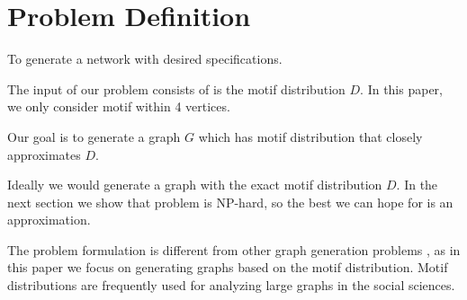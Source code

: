 \section{Problem Definition}
\label{sec:problem}
 To generate a network with desired specifications.

 The input of our problem consists of is the motif 
distribution $D$. In this paper, we only consider motif within 4 vertices.

 Our goal is to generate a graph $G$ which has motif distribution that closely
approximates $D$.

Ideally we would generate a graph with the exact motif distribution $D$.
In the next section we show that problem is NP-hard, so the best we can 
hope for is an approximation.

The problem formulation is different from other graph generation problems
\cite{erdds1959random, watts1998collective, albert2002statistical,
newman2009random, molloy1995critical}, as in this paper we focus on
generating graphs based on the motif distribution.
Motif distributions are frequently used for analyzing large graphs in the
social sciences.
